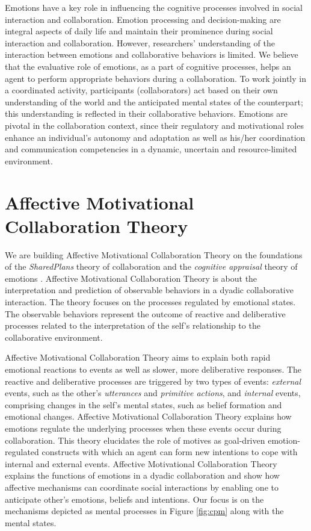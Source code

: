 \documentclass[letterpaper]{article}
\begin{document}
Emotions have a key role in influencing the cognitive processes involved in
social interaction and collaboration. Emotion processing and decision-making are
integral aspects of daily life and maintain their prominence during social
interaction and collaboration. However, researchers' understanding of the
interaction between emotions and collaborative behaviors is limited. We believe
that the evaluative role of emotions, as a part of cognitive processes, helps an
agent to perform appropriate behaviors during a collaboration. To work jointly
in a coordinated activity, participants (collaborators) act based on their own
understanding of the world and the anticipated mental states of the counterpart;
this understanding is reflected in their collaborative behaviors. Emotions are
pivotal in the collaboration context, since their regulatory and motivational
roles enhance an individual's autonomy and adaptation as well as his/her
coordination and communication competencies in a dynamic, uncertain and
resource-limited environment.

\section{Affective Motivational Collaboration Theory}

We are building Affective Motivational Collaboration Theory on the foundations
of the \textit{SharedPlans} theory of collaboration \cite{grosz:shared-plans}
and the \textit{cognitive appraisal} theory of emotions
\cite{gratch:domain-independent}. Affective Motivational Collaboration Theory is
about the interpretation and prediction of observable behaviors in a dyadic
collaborative interaction. The theory focuses on the processes regulated by
emotional states. The observable behaviors represent the outcome of reactive and
deliberative processes related to the interpretation of the self's relationship
to the collaborative environment. 

Affective Motivational Collaboration Theory aims to explain both rapid emotional
reactions to events as well as slower, more deliberative responses. The reactive
and deliberative processes are triggered by two types of events:
\textit{external} events, such as the other's \textit{utterances} and
\textit{primitive actions}, and \textit{internal} events, comprising changes in
the self's mental states, such as belief formation and emotional changes.
Affective Motivational Collaboration Theory explains how emotions regulate the
underlying processes when these events occur during collaboration. This theory
elucidates the role of motives as goal-driven emotion-regulated constructs with
which an agent can form new intentions to cope with internal and external
events. Affective Motivational Collaboration Theory explains the functions of
emotions in a dyadic collaboration and show how affective mechanisms can
coordinate social interactions by enabling one to anticipate other's emotions,
beliefs and intentions. Our focus is on the mechanisms depicted as mental
processes in Figure \ref{fig:cpm} along with the mental states.
\end{document}
